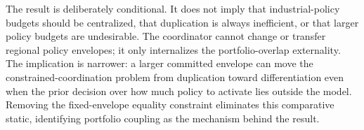 \documentclass[12pt]{article}
\begin{document}
The result is deliberately conditional. It does not imply that industrial-policy budgets should be centralized, that duplication is always inefficient, or that larger policy budgets are undesirable. The coordinator cannot change or transfer regional policy envelopes; it only internalizes the portfolio-overlap externality. The implication is narrower: a larger committed envelope can move the constrained-coordination problem from duplication toward differentiation even when the prior decision over how much policy to activate lies outside the model. Removing the fixed-envelope equality constraint eliminates this comparative static, identifying portfolio coupling as the mechanism behind the result.



\end{document}
